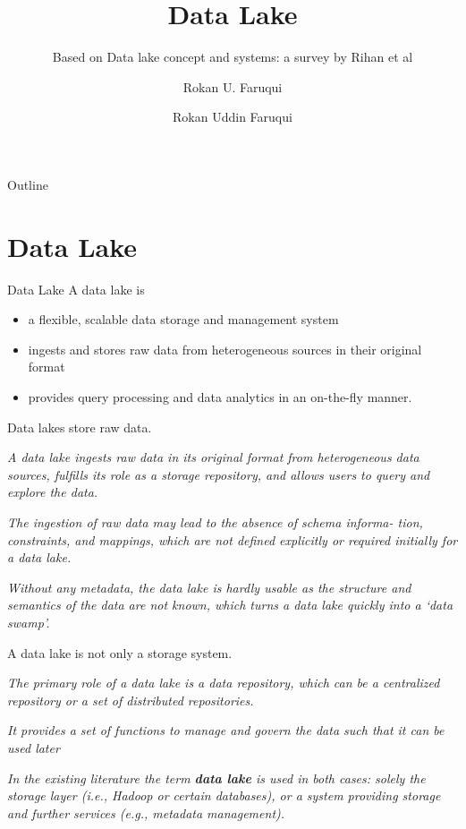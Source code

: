 \documentclass[xcolor=x11names,compress, 24pt]{beamer}
\title{\sc Data Lake}
\subtitle{  Based on Data lake concept and systems: a survey by Rihan et al}
\author{Rokan U. Faruqui }
\author{\sc Rokan Uddin Faruqui }
\institute[CSE, CU]{Associate Professor \\ Dept of Computer Science and Engineering \\ University of Chittaong, Bangladesh\\ Email: \textit{rokan@cu.ac.bd}}
\date{} %
\renewcommand{\(}{\begin{columns}}
\renewcommand{\)}{\end{columns}}
\newcommand{\<}[1]{\begin{column}{#1}}
\renewcommand{\>}{\end{column}}
\begin{document}
\begin{frame}[plain]
\titlepage
\end{frame}

\begin{frame}{Outline}
\tableofcontents
\end{frame}
 \section{Data Lake}
 \begin{frame}{Data Lake}
 	A data lake is
 \begin{itemize}
 	\item  a flexible, scalable data storage and management system \vspace{.25cm}
 	
    \item ingests and stores raw data from heterogeneous sources in their original format  \vspace{.25cm}
    
    \item provides query processing and data analytics in an on-the-fly manner.  \vspace{.25cm}
 	
 	 
 \end{itemize}
 \end{frame}


 \begin{frame}{Data lakes store raw data.}
 	
 \emph{A data lake ingests raw data in its original format from heterogeneous data sources, fulfills its role as a storage repository, and allows users to query and explore the data.} \vspace{.25cm}
 
 \emph{The ingestion of raw data may lead to the absence of schema informa- tion, constraints, and mappings, which are not defined explicitly or required initially for a data lake.}\vspace{.25cm}
 
 \emph{ Without any metadata, the data lake is hardly usable as the structure and semantics of the data are not known, which turns a data lake quickly into a ‘data swamp’.}\vspace{.25cm}
\end{frame}


 \begin{frame}{A data lake is not only a storage system.}
	
	\emph{The primary role of a data lake is a data repository, which can be a centralized repository or a set of distributed repositories.} \vspace{.25cm}
	
	\emph{It provides a set of functions to manage and govern the data such that it can be used later}\vspace{.25cm}
	
	\emph{ In the existing literature the term \textbf{data lake} is used in both cases: solely the storage layer (i.e., Hadoop or certain databases), or a system providing storage and further services (e.g., metadata management).}\vspace{.25cm}
\end{frame}
\end{document}
